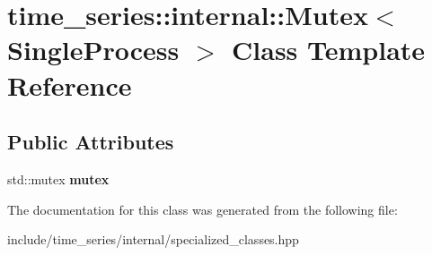 \hypertarget{classtime__series_1_1internal_1_1Mutex_3_01SingleProcess_01_4}{}\section{time\+\_\+series\+:\+:internal\+:\+:Mutex$<$ Single\+Process $>$ Class Template Reference}
\label{classtime__series_1_1internal_1_1Mutex_3_01SingleProcess_01_4}
\subsection*{Public Attributes}
\begin{DoxyCompactItemize}
\item 
\mbox{\label{classtime__series_1_1internal_1_1Mutex_3_01SingleProcess_01_4_a5f39c59650dd603cc102dbbc15f82d51}} 
std\+::mutex {\bfseries mutex}
\end{DoxyCompactItemize}


The documentation for this class was generated from the following file\+:\begin{DoxyCompactItemize}
\item 
include/time\+\_\+series/internal/specialized\+\_\+classes.\+hpp\end{DoxyCompactItemize}
